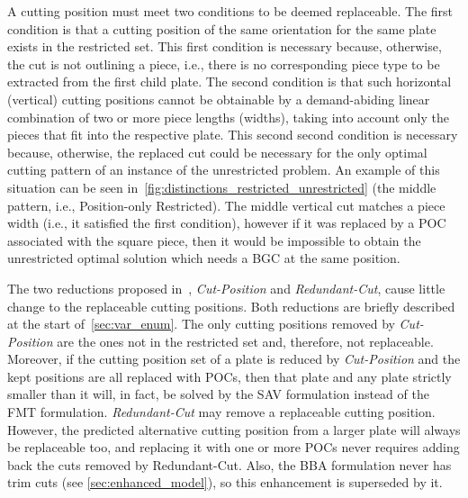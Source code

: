 \documentclass[ppgc,tese,english,formais,babel]{iiufrgs}
\begin{document}
A cutting position must meet two conditions to be deemed replaceable.
The first condition is that a cutting position of the same orientation for the same plate exists in the restricted set.
This first condition is necessary because, otherwise, the cut is not outlining a piece, i.e., there is no corresponding piece type to be extracted from the first child plate.
The second condition is that such horizontal (vertical) cutting positions cannot be obtainable by a demand-abiding linear combination of two or more piece lengths (widths), taking into account only the pieces that fit into the respective plate.
This second second condition is necessary because, otherwise, the replaced cut could be necessary for the only optimal cutting pattern of an instance of the unrestricted problem.
An example of this situation can be seen in~\cref{fig:distinctions_restricted_unrestricted} (the middle pattern, i.e., Position-only Restricted).
The middle vertical cut matches a piece width (i.e., it satisfied the first condition), however if it was replaced by a POC associated with the square piece, then it would be impossible to obtain the unrestricted optimal solution which needs a BGC at the same position.

The two reductions proposed in~\citet{furini:2016}, \emph{Cut-Position} and \emph{Redundant-Cut}, cause little change to the replaceable cutting positions.
Both reductions are briefly described at the start of~\cref{sec:var_enum}.
The only cutting positions removed by \emph{Cut-Position} are the ones not in the restricted set and, therefore, not replaceable.
Moreover, if the cutting position set of a plate is reduced by \emph{Cut-Position} and the kept positions are all replaced with POCs, then that plate and any plate strictly smaller than it will, in fact, be solved by the SAV formulation instead of the FMT formulation.
\emph{Redundant-Cut} may remove a replaceable cutting position. However, the predicted alternative cutting position from a larger plate will always be replaceable too, and replacing it with one or more POCs never requires adding back the cuts removed by Redundant-Cut.
Also, the BBA formulation never has trim cuts (see \cref{sec:enhanced_model}), so this enhancement is superseded by it.
\end{document}
